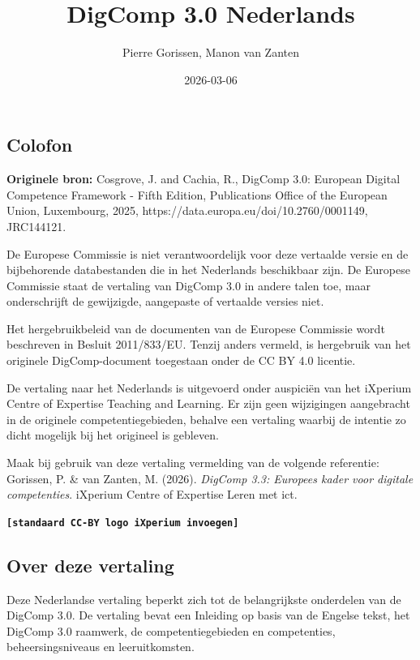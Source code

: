 \documentclass[
  dutch,
  letterpaper,
  DIV=11,
  numbers=noendperiod]{scrartcl}
\title{DigComp 3.0 Nederlands}
\author{Pierre Gorissen, Manon van Zanten}
\date{2026-03-06}
\begin{document}
\maketitle


\subsection*{Colofon}\label{sec-colofon}

\textbf{Originele bron:} Cosgrove, J. and Cachia, R., DigComp 3.0:
European Digital Competence Framework - Fifth Edition, Publications
Office of the European Union, Luxembourg, 2025,
https://data.europa.eu/doi/10.2760/0001149, JRC144121.

De Europese Commissie is niet verantwoordelijk voor deze vertaalde
versie en de bijbehorende databestanden die in het Nederlands
beschikbaar zijn. De Europese Commissie staat de vertaling van DigComp
3.0 in andere talen toe, maar onderschrijft de gewijzigde, aangepaste of
vertaalde versies niet.

Het hergebruikbeleid van de documenten van de Europese Commissie wordt
beschreven in Besluit 2011/833/EU. Tenzij anders vermeld, is hergebruik
van het originele DigComp-document toegestaan onder de CC BY 4.0
licentie.

De vertaling naar het Nederlands is uitgevoerd onder auspiciën van het
iXperium Centre of Expertise Teaching and Learning. Er zijn geen
wijzigingen aangebracht in de originele competentiegebieden, behalve een
vertaling waarbij de intentie zo dicht mogelijk bij het origineel is
gebleven.

Maak bij gebruik van deze vertaling vermelding van de volgende
referentie: Gorissen, P. \& van Zanten, M. (2026). \emph{DigComp 3.3:
Europees kader voor digitale competenties}. iXperium Centre of Expertise
Leren met ict.

\textbf{\texttt{{[}standaard\ CC-BY\ logo\ iXperium\ invoegen{]}}}

\subsection*{Over deze vertaling}\label{sec-over-vertaling}

Deze Nederlandse vertaling beperkt zich tot de belangrijkste onderdelen
van de DigComp 3.0. De vertaling bevat een Inleiding op basis van de
Engelse tekst, het DigComp 3.0 raamwerk, de competentiegebieden en
competenties, beheersingsniveaus en leeruitkomsten.
\end{document}
